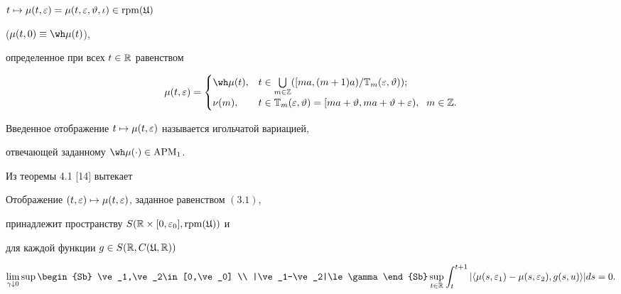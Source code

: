 $t\mapsto\mu(t,\varepsilon)=\mu(t,\varepsilon,\vartheta,\iota)\in \operatorname{rpm}(\frak U)$


($\mu(t,0)\equiv\wh\mu(t)$),


определенное при всех $t\in\Bbb R$ равенством


\begin{equation}


\mu(t,\ve)=


\begin{cases}


\wh\mu(t), &


t\in\bigcup\lt_{m\in\Bbb Z}([ma,(m+1)a)/\Bbb T_{m}(\ve,\vt));\\


\nu(m), & t\in \Bbb T_{m}(\ve,\vt)=[ma+\vt,ma+\vt+\ve),\ \; m\in\Bbb Z.


\end{cases}


\end{equation}





Введенное отображение $t\mapsto\mu(t,\varepsilon)$ называется игольчатой вариацией,


отвечающей заданному $\wh\mu(\cdot)\in \APM_{1}$.





Из теоремы 4.1 [14] вытекает





\begin{lems}


Отображение $(t,\varepsilon)\mapsto\mu(t,\varepsilon)$, заданное равенством $(3.1)$, 


принадлежит пространству $S(\Bbb R\times[0,\varepsilon_0],\operatorname{rpm}(\frak U))$ и


для каждой функции $g\in S(\Bbb R,C(\frak U,\Bbb R))$


$$


\lim_{\gamma\downarrow0}\sup\begin{Sb}


\ve_1,\ve_2\in[0,\ve_0] \\ |\ve_1-\ve_2|\le\gamma\end{Sb}


\sup_{t\in\R}\int_{t}^{t+1}|


\la\mu(s,\ve_1)-\mu(s,\ve_2),g(s,u)\ra|ds=0.


$$


\end{lems}





